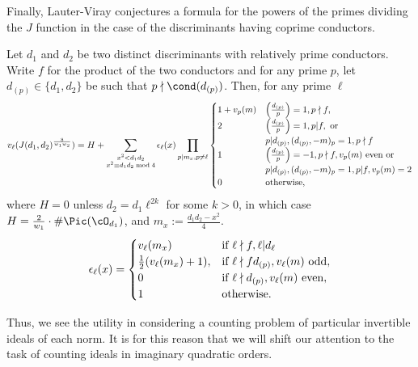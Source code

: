 \documentclass[11pt, proquest]{uwthesis}
\begin{document}
Finally, Lauter-Viray conjectures a formula for the powers of the primes dividing the $J$ function in the case of the discriminants having coprime conductors.

\begin{conjecture}
  Let $d_1$ and $d_2$ be two distinct discriminants with relatively prime conductors.  Write $f$ for the product of the two conductors and for any prime $p$, let $d_{(p)}\in\{d_1,d_2\}$ be such that $p\nmid\cond(d_{(p)})$.  Then, for any prime $\ell$
  \[
    v_{\ell}(J(d_1,d_2)^{\frac{8}{w_1w_2}}) = H +
    \sum_{\substack{x^2 < d_1d_2\\x^2\equiv d_1d_2\bmod{4}}}
    \epsilon_{\ell}(x)\prod_{p|m_x, p\ne\ell}
    \begin{cases}
      1 + v_p(m) & \left(\frac{d_{(p)}}{p}\right) = 1, p\nmid f,                                    \\
      2          & \left(\frac{d_{(p)}}{p}\right) = 1, p| f, \textup{ or}                           \\
                 & p|d_{(p)}, (d_{(p)}, -m)_p = 1, p\nmid f                                         \\
      1          & \left(\frac{d_{(p)}}{p}\right) = -1, p\nmid f, v_p(m)\textup{ even} \textup{ or} \\
                 & p|d_{(p)}, (d_{(p)}, -m)_p = 1, p |f , v_p(m) = 2                                \\
      0          & \textup{otherwise},
    \end{cases}
  \]
  where $H = 0$ unless $d_2 = d_1\ell^{2k}$ for some $k >0 $, in which case $H = \frac{2}{w_1}\cdot\#\Pic(\cO_{d_1})$, and $m_x := \frac{d_1d_2 - x^2}{4}$.
  \[
    \epsilon_{\ell}(x) =
    \begin{cases}
      v_{\ell}(m_x)               & \textup{if }\ell\nmid f, \ell|d_{\ell}                     \\
      \frac12(v_{\ell}(m_x) + 1), &
      \textup{if }\ell\nmid fd_{(p)}, v_{\ell}(m) \textup{ odd},                               \\
      0                           & \textup{if }\ell\nmid d_{(p)}, v_{\ell}(m) \textup{ even}, \\
      1                           & \textup{otherwise}.
    \end{cases}
  \]
\end{conjecture}

Thus, we see the utility in considering a counting problem of particular invertible ideals of each norm.
It is for this reason that we will shift our attention to the task of counting ideals in imaginary quadratic orders.
\end{document}
